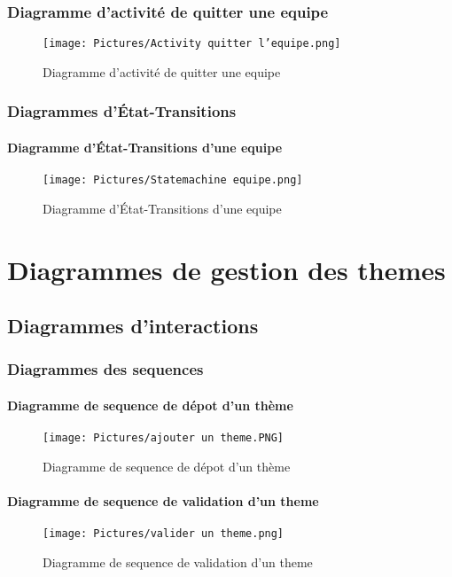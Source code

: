 \documentclass[11pt,fleqn]{book} %
\begin{document}
\subsection{Diagramme d'activité de quitter une equipe}
\begin{figure}[h]
    \centering
    \texttt{[image: Pictures/Activity quitter l'equipe.png]}
    \caption{Diagramme d'activité de quitter une equipe}
    \label{fig:pca}
\end{figure}
\newpage
\subsection{Diagrammes d’État-Transitions}
\subsubsection{Diagramme d'État-Transitions d'une equipe}
\begin{figure}[h]
    \centering
    \texttt{[image: Pictures/Statemachine equipe.png]}
    \caption{Diagramme d'État-Transitions d'une equipe}
    \label{fig:pca}
\end{figure}
\chapter{Diagrammes de gestion des themes}
\section{Diagrammes d'interactions}
\subsection{Diagrammes des sequences}
\subsubsection{Diagramme de sequence de dépot d'un thème}
\begin{figure}[h]
    \centering
    \texttt{[image: Pictures/ajouter un theme.PNG]}
    \caption{Diagramme de sequence de dépot d'un thème}
    \label{fig:pca}
\end{figure}
\newpage
\subsubsection{Diagramme de sequence de validation d'un theme}
\begin{figure}[h]
    \centering
    \texttt{[image: Pictures/valider un theme.png]}
    \caption{Diagramme de sequence de validation d'un theme}
    \label{fig:pca}
\end{figure}
\newpage
\end{document}
